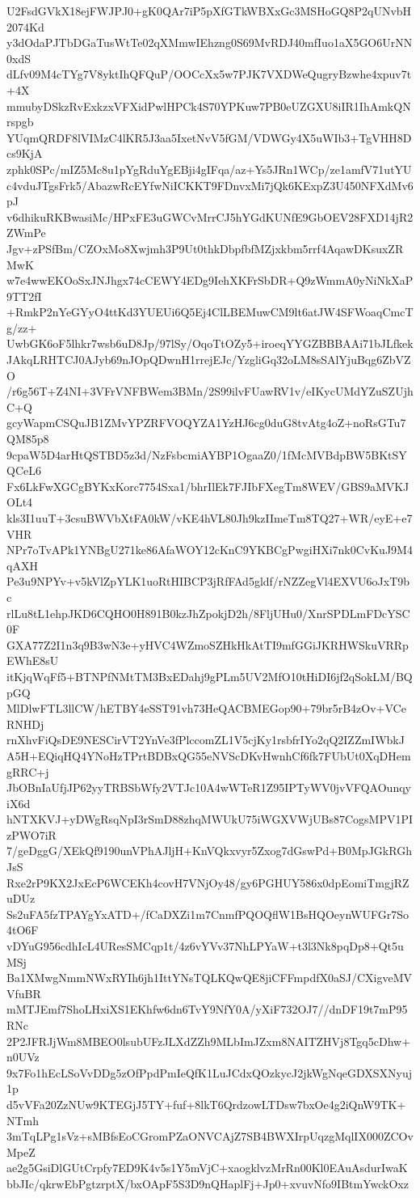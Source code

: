 U2FsdGVkX18ejFWJPJ0+gK0QAr7iP5pXfGTkWBXxGc3MSHoGQ8P2qUNvbH2074Kd
y3dOdaPJTbDGaTusWtTe02qXMmwIEhzng0S69MvRDJ40mfIuo1aX5GO6UrNN0xdS
dLfv09M4cTYg7V8yktIhQFQuP/OOCcXx5w7PJK7VXDWeQugryBzwhe4xpuv7t+4X
mmubyDSkzRvExkzxVFXidPwlHPCk4S70YPKuw7PB0eUZGXU8iIR1IhAmkQNrspgb
YUqmQRDF8lVIMzC4lKR5J3aa5IxetNvV5fGM/VDWGy4X5uWIb3+TgVHH8Dcs9KjA
zphk0SPc/mIZ5Mc8u1pYgRduYgEBji4gIFqa/az+Ys5JRn1WCp/ze1amfV71utYU
c4vduJTgsFrk5/AbazwRcEYfwNiICKKT9FDnvxMi7jQk6KExpZ3U450NFXdMv6pJ
v6dhikuRKBwasiMc/HPxFE3uGWCvMrrCJ5hYGdKUNfE9GbOEV28FXD14jR2ZWmPe
Jgv+zPSfBm/CZOxMo8Xwjmh3P9Ut0thkDbpfbfMZjxkbm5rrf4AqawDKsuxZRMwK
w7e4wwEKOoSxJNJhgx74cCEWY4EDg9IehXKFrSbDR+Q9zWmmA0yNiNkXaP9TT2fI
+RmkP2nYeGYyO4ttKd3YUEUi6Q5Ej4ClLBEMuwCM9lt6atJW4SFWoaqCmcTg/zz+
UwbGK6oF5lhkr7wsb6uD8Jp/97lSy/OqoTtOZy5+iroeqYYGZBBBAAi71bJLfkek
JAkqLRHTCJ0AJyb69nJOpQDwnH1rrejEJc/YzgliGq32oLM8sSAlYjuBqg6ZbVZO
/r6g56T+Z4NI+3VFrVNFBWem3BMn/2S99ilvFUawRV1v/eIKycUMdYZuSZUjhC+Q
gcyWapmCSQuJB1ZMvYPZRFVOQYZA1YzHJ6cg0duG8tvAtg4oZ+noRsGTu7QM85p8
9cpaW5D4arHtQSTBD5z3d/NzFsbcmiAYBP1OgaaZ0/1fMcMVBdpBW5BKtSYQCeL6
Fx6LkFwXGCgBYKxKorc7754Sxa1/bhrIlEk7FJIbFXegTm8WEV/GBS9aMVKJOLt4
kls3I1uuT+3csuBWVbXtFA0kW/vKE4hVL80Jh9kzIImeTm8TQ27+WR/eyE+e7VHR
NPr7oTvAPk1YNBgU271ke86AfaWOY12cKnC9YKBCgPwgiHXi7nk0CvKuJ9M4qAXH
Pe3u9NPYv+v5kVlZpYLK1uoRtHIBCP3jRfFAd5gldf/rNZZegVl4EXVU6oJxT9bc
rlLu8tL1ehpJKD6CQHO0H891B0kzJhZpokjD2h/8FljUHu0/XnrSPDLmFDcYSC0F
GXA77Z2I1n3q9B3wN3e+yHVC4WZmoSZHkHkAtTI9mfGGiJKRHWSkuVRRpEWhE8sU
itKjqWqFf5+BTNPfNMtTM3BxEDahj9gPLm5UV2MfO10tHiDI6jf2qSokLM/BQpGQ
MlDlwFTL3llCW/hETBY4eSST91vh73HeQACBMEGop90+79br5rB4zOv+VCeRNHDj
rnXhvFiQsDE9NESCirVT2YnVe3fPlccomZL1V5cjKy1rsbfrIYo2qQ2IZZmIWbkJ
A5H+EQiqHQ4YNoHzTPrtBDBxQG55eNVScDKvHwnhCf6fk7FUbUt0XqDHemgRRC+j
JbOBnIaUfjJP62yyTRBSbWfy2VTJc10A4wWTeR1Z95IPTyWV0jvVFQAOunqyiX6d
hNTXKVJ+yDWgRsqNpI3rSmD88zhqMWUkU75iWGXVWjUBs87CogsMPV1PIzPWO7iR
7/geDggG/XEkQf9190unVPhAJljH+KnVQkxvyr5Zxog7dGswPd+B0MpJGkRGhJsS
Rxe2rP9KX2JxEcP6WCEKh4covH7VNjOy48/gy6PGHUY586x0dpEomiTmgjRZuDUz
Ss2uFA5fzTPAYgYxATD+/fCaDXZi1m7CnmfPQOQflW1BsHQOeynWUFGr7So4tO6F
vDYuG956cdhIcL4UResSMCqp1t/4z6vYVv37NhLPYaW+t3l3Nk8pqDp8+Qt5uMSj
Ba1XMwgNmmNWxRYIh6jh1IttYNsTQLKQwQE8jiCFFmpdfX0aSJ/CXigveMVVfuBR
mMTJEmf7ShoLHxiXS1EKhfw6dn6TvY9NfY0A/yXiF732OJ7//dnDF19t7mP95RNc
2P2JFRJjWm8MBEO0lsubUFzJLXdZZh9MLbImJZxm8NAITZHVj8Tgq5cDhw+n0UVz
9x7Fo1hEcLSoVvDDg5zOfPpdPmIeQfK1LuJCdxQOzkycJ2jkWgNqeGDXSXNyuj1p
d5vVFa20ZzNUw9KTEGjJ5TY+fuf+8lkT6QrdzowLTDsw7bxOe4g2iQnW9TK+NTmh
3mTqLPg1sVz+sMBfsEoCGromPZaONVCAjZ7SB4BWXIrpUqzgMqlIX000ZCOvMpeZ
ae2g5GsiDlGUtCrpfy7ED9K4v5s1Y5mVjC+xaogklvzMrRn00Kl0EAuAsdurIwaK
bbJIc/qkrwEbPgtzrptX/bxOApF5S3D9nQHaplFj+Jp0+xvuvNfo9IBtmYwckOxz
